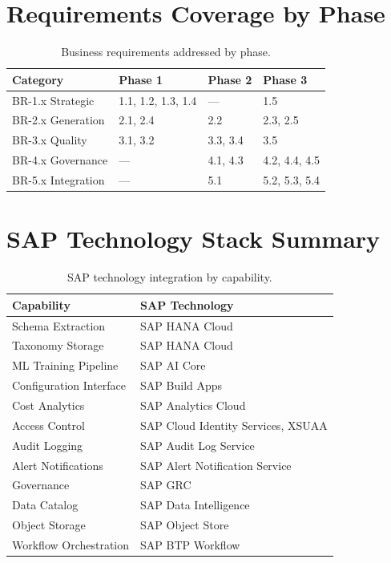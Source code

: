 \documentclass[12pt,a4paper,twoside]{report}
\begin{document}
\section{Requirements Coverage by Phase}

\begin{table}[htbp]
\centering
\caption{Business requirements addressed by phase.}
\label{tab:req-by-phase}
\scriptsize
\begin{tabularx}{\textwidth}{@{}l X X X@{}}
\toprule
\textbf{Category} & \textbf{Phase 1} & \textbf{Phase 2} & \textbf{Phase 3} \\
\midrule
BR-1.x Strategic & 1.1, 1.2, 1.3, 1.4 & --- & 1.5 \\
BR-2.x Generation & 2.1, 2.4 & 2.2 & 2.3, 2.5 \\
BR-3.x Quality & 3.1, 3.2 & 3.3, 3.4 & 3.5 \\
BR-4.x Governance & --- & 4.1, 4.3 & 4.2, 4.4, 4.5 \\
BR-5.x Integration & --- & 5.1 & 5.2, 5.3, 5.4 \\
\bottomrule
\end{tabularx}
\end{table}


\section{SAP Technology Stack Summary}

\begin{table}[htbp]
\centering
\caption{SAP technology integration by capability.}
\label{tab:sap-stack}
\footnotesize
\begin{tabularx}{\textwidth}{@{}l X@{}}
\toprule
\textbf{Capability} & \textbf{SAP Technology} \\
\midrule
Schema Extraction & SAP HANA Cloud \\
Taxonomy Storage & SAP HANA Cloud \\
ML Training Pipeline & SAP AI Core \\
Configuration Interface & SAP Build Apps \\
Cost Analytics & SAP Analytics Cloud \\
Access Control & SAP Cloud Identity Services, XSUAA \\
Audit Logging & SAP Audit Log Service \\
Alert Notifications & SAP Alert Notification Service \\
Governance & SAP GRC \\
Data Catalog & SAP Data Intelligence \\
Object Storage & SAP Object Store \\
Workflow Orchestration & SAP BTP Workflow \\
\bottomrule
\end{tabularx}
\end{table}
\end{document}
